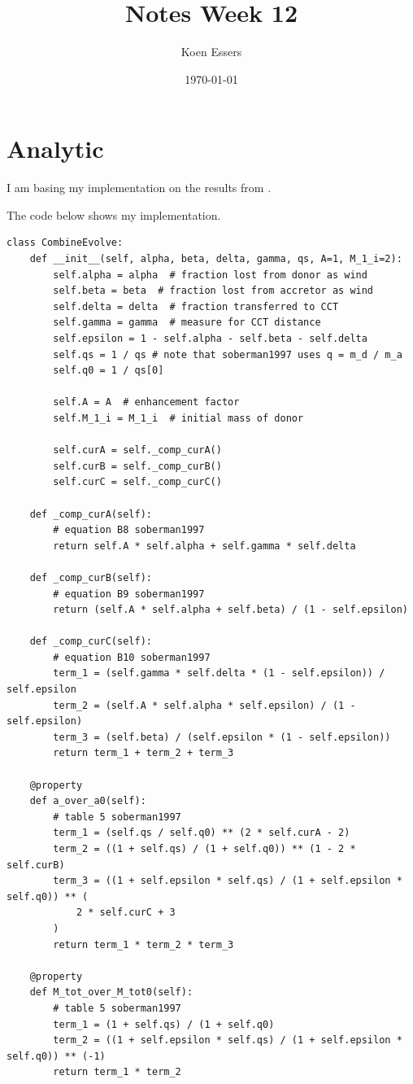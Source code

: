 \documentclass[a4paper,10pt]{article}
\title{Notes Week 12}
\author{Koen Essers}
\date{\today}
\begin{document}
\setuplayout
\section{Analytic}\label{sec:1}
I am basing my implementation on the results from \citet{soberman1997}.

The code below shows my implementation.
\begin{verbatim}
class CombineEvolve:
    def __init__(self, alpha, beta, delta, gamma, qs, A=1, M_1_i=2):
        self.alpha = alpha  # fraction lost from donor as wind
        self.beta = beta  # fraction lost from accretor as wind
        self.delta = delta  # fraction transferred to CCT
        self.gamma = gamma  # measure for CCT distance
        self.epsilon = 1 - self.alpha - self.beta - self.delta
        self.qs = 1 / qs # note that soberman1997 uses q = m_d / m_a
        self.q0 = 1 / qs[0]

        self.A = A  # enhancement factor
        self.M_1_i = M_1_i  # initial mass of donor

        self.curA = self._comp_curA()
        self.curB = self._comp_curB()
        self.curC = self._comp_curC()

    def _comp_curA(self):
        # equation B8 soberman1997
        return self.A * self.alpha + self.gamma * self.delta

    def _comp_curB(self):
        # equation B9 soberman1997
        return (self.A * self.alpha + self.beta) / (1 - self.epsilon)

    def _comp_curC(self):
        # equation B10 soberman1997
        term_1 = (self.gamma * self.delta * (1 - self.epsilon)) / self.epsilon
        term_2 = (self.A * self.alpha * self.epsilon) / (1 - self.epsilon)
        term_3 = (self.beta) / (self.epsilon * (1 - self.epsilon))
        return term_1 + term_2 + term_3

    @property
    def a_over_a0(self):
        # table 5 soberman1997
        term_1 = (self.qs / self.q0) ** (2 * self.curA - 2)
        term_2 = ((1 + self.qs) / (1 + self.q0)) ** (1 - 2 * self.curB)
        term_3 = ((1 + self.epsilon * self.qs) / (1 + self.epsilon * self.q0)) ** (
            2 * self.curC + 3
        )
        return term_1 * term_2 * term_3

    @property
    def M_tot_over_M_tot0(self):
        # table 5 soberman1997
        term_1 = (1 + self.qs) / (1 + self.q0)
        term_2 = ((1 + self.epsilon * self.qs) / (1 + self.epsilon * self.q0)) ** (-1)
        return term_1 * term_2


\end{verbatim}
\end{document}
